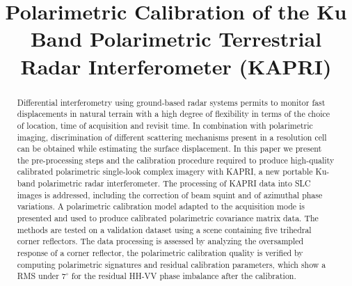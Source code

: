 \documentclass[journal, 10pt, final,letterpaper,]{IEEEtran}
\title{Polarimetric Calibration of the Ku Band Polarimetric Terrestrial Radar Interferometer (KAPRI)}
\author{\IEEEauthorblockN{
	Simone Baffelli,
	Othmar Frey,
	Charles Werner,
	Irena Hajnsek
}}
\begin{document}
\maketitle
\begin{abstract}
Differential interferometry using ground-based radar systems permits to monitor fast displacements in natural terrain with a high degree of flexibility in terms of the choice of location, time of acquisition and revisit time. In combination with polarimetric imaging, discrimination of different scattering mechanisms present in a resolution cell can be obtained while estimating the surface displacement.
In this paper we present the pre-processing steps and the calibration procedure required to produce high-quality calibrated polarimetric single-look complex imagery with KAPRI, a new portable Ku-band polarimetric radar interferometer. The processing of KAPRI data into SLC images is addressed, including the correction of beam squint and of azimuthal phase variations. A polarimetric calibration model adapted to the acquisition mode is presented and used to produce calibrated polarimetric covariance matrix data. The methods are tested on a validation dataset using a scene containing five trihedral corner reflectors. The data processing is assessed by analyzing the oversampled response of a corner reflector, the polarimetric calibration quality is verified by computing polarimetric signatures and residual calibration parameters, which show a RMS under $\mathrm{7^\circ}$ for the residual HH-VV phase imbalance after the calibration.
\end{abstract}





\pagebreak



\end{document}
